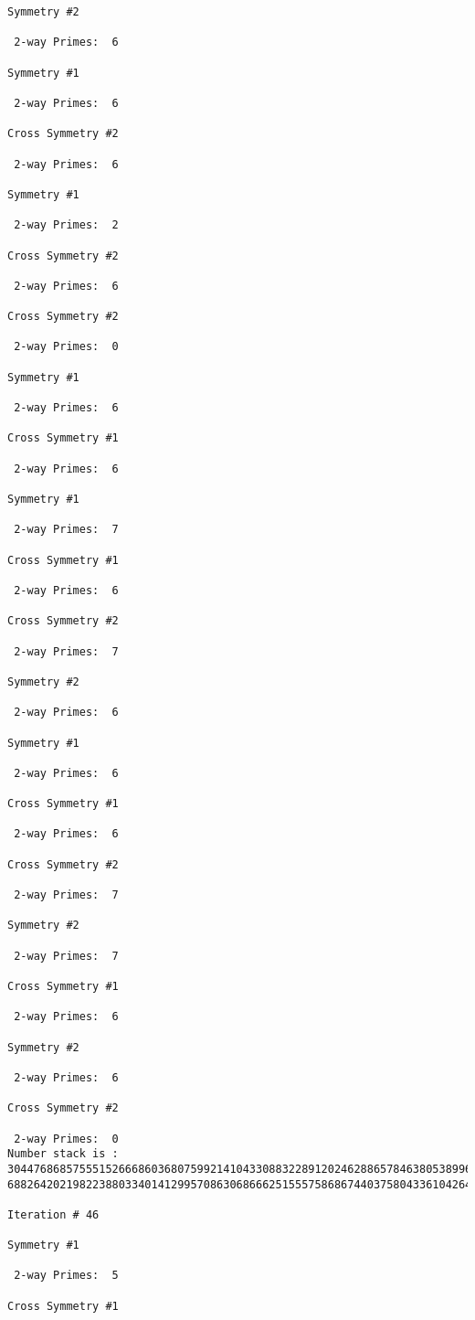 {{{{\begin{verbatim}
Symmetry #2

 2-way Primes: 	6

Symmetry #1

 2-way Primes: 	6

Cross Symmetry #2

 2-way Primes: 	6

Symmetry #1

 2-way Primes: 	2

Cross Symmetry #2

 2-way Primes: 	6

Cross Symmetry #2

 2-way Primes: 	0

Symmetry #1

 2-way Primes: 	6

Cross Symmetry #1

 2-way Primes: 	6

Symmetry #1

 2-way Primes: 	7

Cross Symmetry #1

 2-way Primes: 	6

Cross Symmetry #2

 2-way Primes: 	7

Symmetry #2

 2-way Primes: 	6

Symmetry #1

 2-way Primes: 	6

Cross Symmetry #1

 2-way Primes: 	6

Cross Symmetry #2

 2-way Primes: 	7

Symmetry #2

 2-way Primes: 	7

Cross Symmetry #1

 2-way Primes: 	6

Symmetry #2

 2-way Primes: 	6

Cross Symmetry #2

 2-way Primes: 	0
Number stack is :
30447686857555152666860368075992141043308832289120246288657846380538996794608835958544046240163340857
68826420219822388033401412995708630686662515557586867440375804336104264044585953880649769983508364875

Iteration #	46

Symmetry #1

 2-way Primes: 	5

Cross Symmetry #1


\end{verbatim}}}}}
